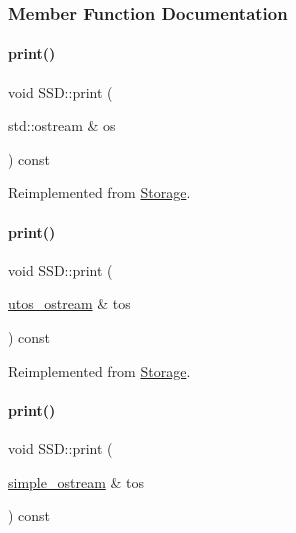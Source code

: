 \subsubsection{Member Function Documentation}
\mbox{\label{class_s_s_d_a3c07aa0fd7bb547cfb4a775513e427a9}} 
\paragraph{\texorpdfstring{print()}{print()}\hspace{0.1cm}{\footnotesize\ttfamily [1/4]}}
{\footnotesize\ttfamily void S\+S\+D\+::print (\begin{DoxyParamCaption}\item[{std\+::ostream \&}]{os }\end{DoxyParamCaption}) const\hspace{0.3cm}{\ttfamily [virtual]}}



Reimplemented from \mbox{\hyperlink{class_storage_aa9f6ffb0fd45839b54bd4e254270445d}{Storage}}.

\mbox{\label{class_s_s_d_ab07086e302f8be99cfa757583d2017a0}} 
\paragraph{\texorpdfstring{print()}{print()}\hspace{0.1cm}{\footnotesize\ttfamily [2/4]}}
{\footnotesize\ttfamily void S\+S\+D\+::print (\begin{DoxyParamCaption}\item[{\mbox{\hyperlink{structutos__ostream}{utos\+\_\+ostream}} \&}]{tos }\end{DoxyParamCaption}) const\hspace{0.3cm}{\ttfamily [virtual]}}



Reimplemented from \mbox{\hyperlink{class_storage_ab7ecf9e0777891b4e1a84bbf391a1cd4}{Storage}}.

\mbox{\label{class_s_s_d_a7efed56d8590399c61d8eefca9295c91}} 
\paragraph{\texorpdfstring{print()}{print()}\hspace{0.1cm}{\footnotesize\ttfamily [3/4]}}
{\footnotesize\ttfamily void S\+S\+D\+::print (\begin{DoxyParamCaption}\item[{\mbox{\hyperlink{structsimple__ostream}{simple\+\_\+ostream}} \&}]{tos }\end{DoxyParamCaption}) const\hspace{0.3cm}{\ttfamily [virtual]}}



